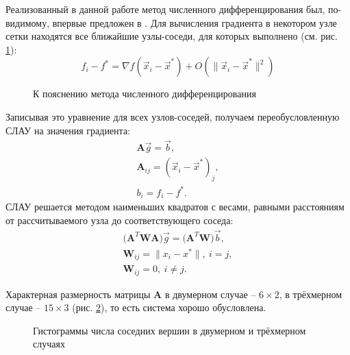 Реализованный в данной работе метод численного дифференцирования был, по-видимому, впервые предложен в \cite{sibson}. Для вычисления градиента в некотором узле сетки находятся все ближайшие узлы-соседи, для которых выполнено (см. рис. \ref{pic:gradient}):
\begin{equation}
f_i - f^{*} = \nabla f (\vec{x}_i - \vec{x}^{*}) + O( \lVert \vec{x}_i - \vec{x}^{*} \rVert ^2)
\end{equation}
\begin{figure}[H]
	\caption{К пояснению метода численного дифференцирования}
	\label{pic:gradient}
\end{figure}
Записывая это уравнение для всех узлов-соседей, получаем переобусловленную СЛАУ на значения градиента:
\begin{eqnarray}
\mathbf{A}\vec{g} = \vec{b}, \\
\mathbf{A}_{ij} = (\vec{x}_i - \vec{x}^{*})_j, \\
b_i = f_i - f^{*}.
\end{eqnarray}
СЛАУ решается методом наименьших квадратов \cite{petrov_lobanov} с весами, равными расстояниям от рассчитываемого узла до соответствующего соседа:
\begin{eqnarray}
\Big( \mathbf{A}^T \mathbf{W} \mathbf{A} \Big) \vec{g} = \Big( \mathbf{A}^T \mathbf{W} \Big) \vec{b}, \\
\mathbf{W}_{ij} = \lVert x_i - x^{*} \rVert,\ i = j, \\
\mathbf{W}_{ij} = 0, \ i \neq j.
\end{eqnarray}

Характерная размерность матрицы $\mathbf{A}$ в двумерном случае -- $6\times2$, в трёхмерном случае -- $15\times3$ (рис. \ref{pic:num_neighbors}), то есть система хорошо обусловлена.
\begin{figure}[H]
	\caption{Гистограммы числа соседних вершин в двумерном и трёхмерном случаях}
	\label{pic:num_neighbors}
\end{figure}


